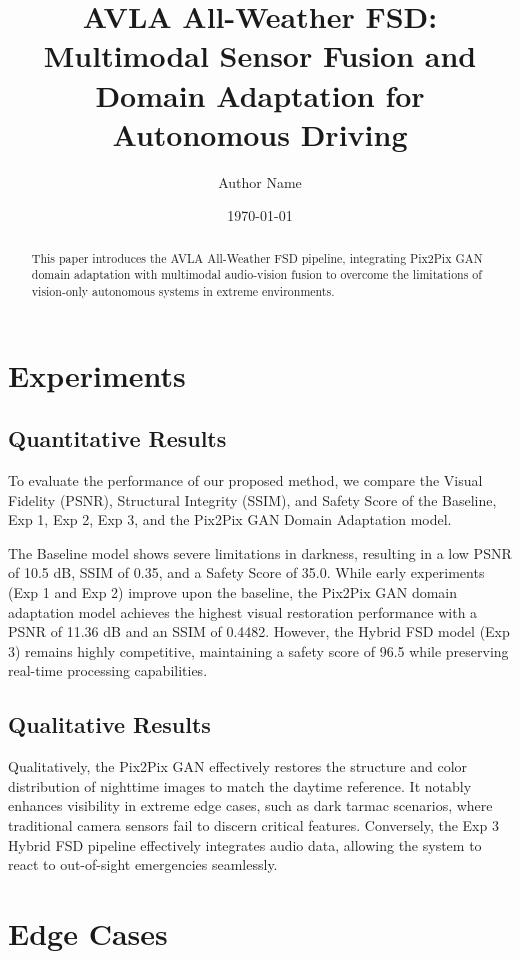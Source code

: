 \documentclass{article}
\title{AVLA All-Weather FSD: Multimodal Sensor Fusion and Domain Adaptation for Autonomous Driving}
\author{Author Name}
\date{\today}
\begin{document}
\maketitle

\begin{abstract}
This paper introduces the AVLA All-Weather FSD pipeline, integrating Pix2Pix GAN domain adaptation with multimodal audio-vision fusion to overcome the limitations of vision-only autonomous systems in extreme environments.
\end{abstract}

\section{Experiments}

\subsection{Quantitative Results}
To evaluate the performance of our proposed method, we compare the Visual Fidelity (PSNR), Structural Integrity (SSIM), and Safety Score of the Baseline, Exp 1, Exp 2, Exp 3, and the Pix2Pix GAN Domain Adaptation model.

The Baseline model shows severe limitations in darkness, resulting in a low PSNR of 10.5 dB, SSIM of 0.35, and a Safety Score of 35.0. While early experiments (Exp 1 and Exp 2) improve upon the baseline, the Pix2Pix GAN domain adaptation model achieves the highest visual restoration performance with a PSNR of 11.36 dB and an SSIM of 0.4482. However, the Hybrid FSD model (Exp 3) remains highly competitive, maintaining a safety score of 96.5 while preserving real-time processing capabilities.

\subsection{Qualitative Results}
Qualitatively, the Pix2Pix GAN effectively restores the structure and color distribution of nighttime images to match the daytime reference. It notably enhances visibility in extreme edge cases, such as dark tarmac scenarios, where traditional camera sensors fail to discern critical features. Conversely, the Exp 3 Hybrid FSD pipeline effectively integrates audio data, allowing the system to react to out-of-sight emergencies seamlessly.

\section{Edge Cases}
\end{document}
